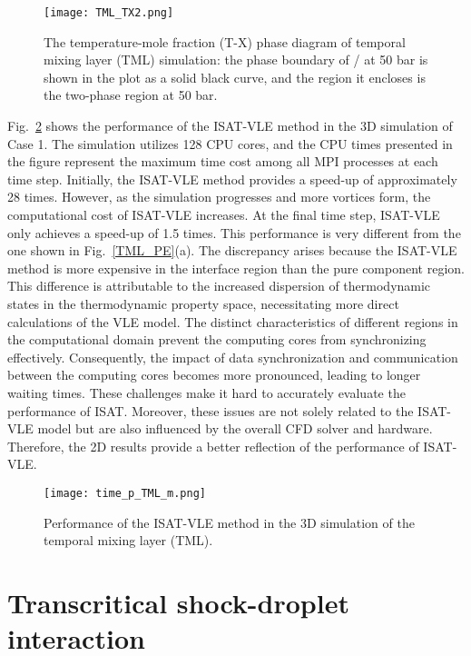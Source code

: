 \begin{figure}[htbp]
\centering
\texttt{[image: TML\_TX2.png]}
\caption{The temperature-mole fraction (T-X) phase diagram of temporal mixing layer (TML) simulation: the phase boundary of / at 50 bar is shown in the plot as a solid black curve, and the region it encloses is the two-phase region at 50 bar.}
\label{TML_TX} 
\end{figure}

Fig.~\ref{TML_3D_performace} shows the performance of the ISAT-VLE method in the 3D simulation of Case 1. The simulation utilizes 128 CPU cores, and the CPU times presented in the figure represent the maximum time cost among all MPI processes at each time step. Initially, the ISAT-VLE method provides a speed-up of approximately 28 times. However, as the simulation progresses and more vortices form, the computational cost of ISAT-VLE increases. At the final time step, ISAT-VLE only achieves a speed-up of 1.5 times. This performance is very different from the one shown in Fig.~\ref{TML_PE}(a). The discrepancy arises because the ISAT-VLE method is more expensive in the interface region than the pure component region. This difference is attributable to the increased dispersion of thermodynamic states in the thermodynamic property space, necessitating more direct calculations of the VLE model. The distinct characteristics of different regions in the computational domain prevent the computing cores from synchronizing effectively. Consequently, the impact of data synchronization and communication between the computing cores becomes more pronounced, leading to longer waiting times. These challenges make it hard to accurately evaluate the performance of ISAT. Moreover, these issues are not solely related to the ISAT-VLE model but are also influenced by the overall CFD solver and hardware. Therefore, the 2D results provide a better reflection of the performance of ISAT-VLE.



\begin{figure}[htbp]
\centering
\texttt{[image: time\_p\_TML\_m.png]}
\caption{Performance of the ISAT-VLE method in the 3D simulation of the temporal mixing layer (TML).}
\label{TML_3D_performace} 
\end{figure}







\section{Transcritical shock-droplet interaction}
